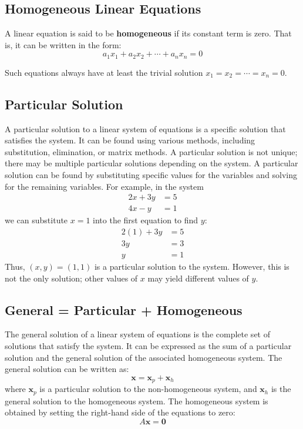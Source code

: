 \subsection{Homogeneous Linear Equations}

A linear equation is said to be \textbf{homogeneous} if its constant term is zero. That is, it can be written in the form:
\[
	a_1x_1 + a_2x_2 + \cdots + a_nx_n = 0
\]

Such equations always have at least the trivial solution \(x_1 = x_2 = \cdots = x_n = 0\).

\subsection{Particular Solution}
A particular solution to a linear system of equations is a specific solution that satisfies the system. It can be found using various methods, including substitution, elimination, or matrix methods. A particular solution is not unique; there may be multiple particular solutions depending on the system.
A particular solution can be found by substituting specific values for the variables and solving for the remaining variables. For example, in the system
\begin{align*}
	2x + 3y & = 5 \\
	4x - y  & = 1
\end{align*}
we can substitute \(x = 1\) into the first equation to find \(y\):
\begin{align*}
	2(1) + 3y & = 5 \\
	3y        & = 3 \\
	y         & = 1
\end{align*}
Thus, \((x, y) = (1, 1)\) is a particular solution to the system. However, this is not the only solution; other values of \(x\) may yield different values of \(y\).

\subsection{General = Particular + Homogeneous}
The general solution of a linear system of equations is the complete set of solutions that satisfy the system. It can be expressed as the sum of a particular solution and the general solution of the associated homogeneous system.
The general solution can be written as:
\begin{equation*}
	\mathbf{x} = \mathbf{x}_p + \mathbf{x}_h
\end{equation*}
where \( \mathbf{x}_p \) is a particular solution to the non-homogeneous system, and \( \mathbf{x}_h \) is the general solution to the homogeneous system.
The homogeneous system is obtained by setting the right-hand side of the equations to zero:
\begin{equation*}
	A \mathbf{x} = \mathbf{0}
\end{equation*}

